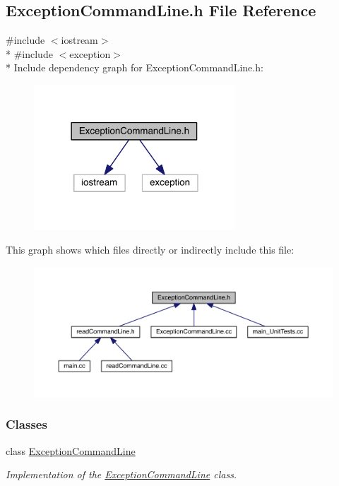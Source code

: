 \hypertarget{a00104}{}\subsection{Exception\+Command\+Line.\+h File Reference}
\label{a00104}
{\ttfamily \#include $<$iostream$>$}\\*
{\ttfamily \#include $<$exception$>$}\\*
Include dependency graph for Exception\+Command\+Line.\+h\+:\nopagebreak
\begin{figure}[H]
\begin{center}
\leavevmode
\includegraphics[width=214pt]{a00138}
\end{center}
\end{figure}
This graph shows which files directly or indirectly include this file\+:\nopagebreak
\begin{figure}[H]
\begin{center}
\leavevmode
\includegraphics[width=350pt]{a00139}
\end{center}
\end{figure}
\subsubsection*{Classes}
\begin{DoxyCompactItemize}
\item 
class \hyperlink{a00026}{Exception\+Command\+Line}
\begin{DoxyCompactList}\small\item\em Implementation of the \hyperlink{a00026}{Exception\+Command\+Line} class. \end{DoxyCompactList}\end{DoxyCompactItemize}
